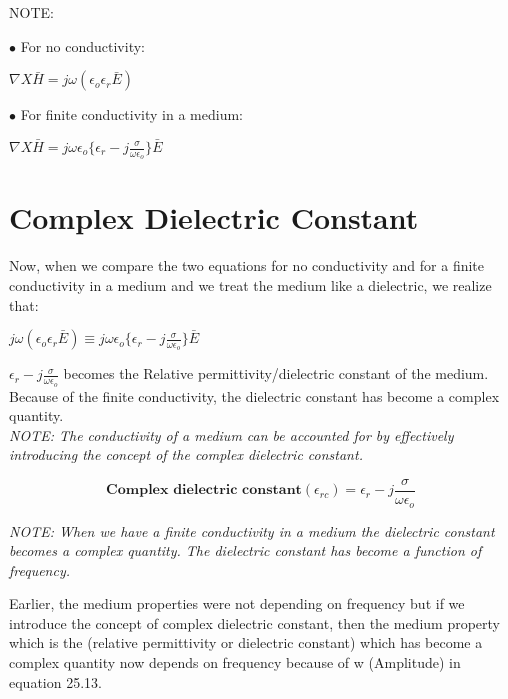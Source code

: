 	NOTE: 
	
	$\bullet$ For no conductivity:
	\begin{center}
		$\nabla X \bar{H} = j \omega(\epsilon_{o}\epsilon_{r}\bar{E})$
	\end{center}
	
	$\bullet$ For finite conductivity in a medium:
	\begin{center}
		$\nabla X \bar{H} = j\omega\epsilon_{o}\bigg\{\epsilon_{r} -j \frac{\sigma}{\omega\epsilon_{o}}\bigg\}\bar{E}$ 
	\end{center}
	
	\section{\textbf{Complex Dielectric Constant}}
	Now, when we compare the two equations for no conductivity and for a finite conductivity in a medium and we treat the medium like a dielectric, we realize that:
	
	\begin{center}
		$j \omega(\epsilon_{o}\epsilon_{r}\bar{E}) \equiv j\omega\epsilon_{o}\bigg\{\epsilon_{r} -j \frac{\sigma}{\omega\epsilon_{o}}\bigg\}\bar{E}$ 
	\end{center}
	
	$\epsilon_{r} -j \frac{\sigma}{\omega\epsilon_{o}}$ becomes the Relative permittivity/dielectric constant of the medium.\\
	
	Because of the finite conductivity, the dielectric constant has become a complex quantity.\\
	
	\textit{NOTE: The conductivity of a medium can be accounted for by effectively introducing the concept of the complex dielectric constant.}
	
	\begin{equation}
	\textbf{Complex dielectric constant} (\epsilon_{rc}) = \epsilon_{r} -j \frac{\sigma}{\omega\epsilon_{o}}
	\end{equation}
	
	\textit{NOTE:
		When we have a finite conductivity in a medium the dielectric constant becomes a complex quantity. The dielectric constant has become a function of frequency.}
	
	
	Earlier, the medium properties were not depending on frequency but if we introduce the concept of complex dielectric constant, then the medium property which is the (relative permittivity or dielectric constant) which has become a complex quantity now depends on frequency because of w (Amplitude) in equation 25.13.\\
	
